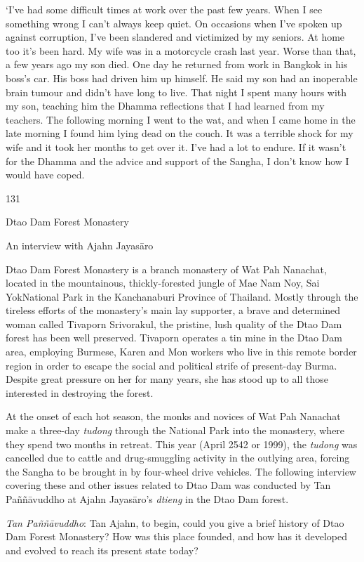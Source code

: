 `I've had some difficult times at work over the past few years. When I
see something wrong I can't always keep quiet. On occasions when I've
spoken up against corruption, I've been slandered and victimized by my
seniors. At home too it's been hard. My wife was in a motorcycle crash
last year. Worse than that, a few years ago my son died. One day he
returned from work in Bangkok in his boss's car. His boss had driven him
up himself. He said my son had an inoperable brain tumour and didn't
have long to live. That night I spent many hours with my son, teaching
him the Dhamma reflections that I had learned from my teachers. The
following morning I went to the wat, and when I came home in the late
morning I found him lying dead on the couch. It was a terrible shock for
my wife and it took her months to get over it. I've had a lot to endure.
If it wasn't for the Dhamma and the advice and support of the Sangha, I
don't know how I would have coped.



131

Dtao Dam Forest Monastery

An interview with Ajahn Jayasāro

Dtao Dam Forest Monastery is a branch monastery of Wat Pah Nanachat,
located in the mountainous, thickly-forested jungle of Mae Nam Noy, Sai
YokNational Park in the Kanchanaburi Province of Thailand. Mostly
through the tireless efforts of the monastery's main lay supporter, a
brave and determined woman called Tivaporn Srivorakul, the pristine,
lush quality of the Dtao Dam forest has been well preserved. Tivaporn
operates a tin mine in the Dtao Dam area, employing Burmese, Karen and
Mon workers who live in this remote border region in order to escape the
social and political strife of present-day Burma. Despite great pressure
on her for many years, she has stood up to all those interested in
destroying the forest.

At the onset of each hot season, the monks and novices of Wat Pah
Nanachat make a three-day \emph{tudong} through the National Park into
the monastery, where they spend two months in retreat. This year (April
2542 or 1999), the \emph{tudong} was cancelled due to cattle and
drug-smuggling activity in the outlying area, forcing the Sangha to be
brought in by four-wheel drive vehicles. The following interview
covering these and other issues related to Dtao Dam was conducted by Tan
Paññāvuddho at Ajahn Jayasāro's \emph{dtieng} in the Dtao Dam forest.

\emph{Tan Paññāvuddho}: Tan Ajahn, to begin, could you give a brief
history of Dtao Dam Forest Monastery? How was this place founded, and
how has it developed and evolved to reach its present state today?

